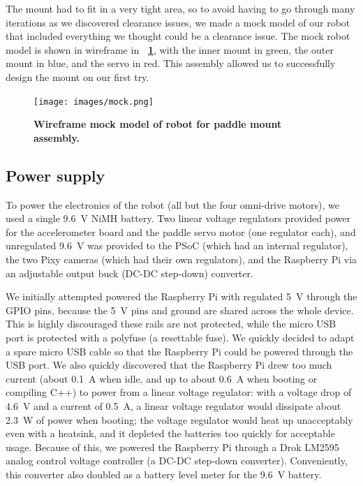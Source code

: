 \documentclass[letterpaper, 11pt]{article}
\newcommand*{\figref}[1]{\textbf{\figurename~\ref{#1}}}
\begin{document}
\begin{enumerate}[label=\textbf{\arabic*.}]
The mount had to fit in a very tight area, so to avoid having to go through many iterations as we discovered clearance issues, we made a mock model of our robot that included everything we thought could be a clearance issue. The mock robot model is shown in wireframe in \figref{fig:mock}, with the inner mount in green, the outer mount in blue, and the servo in red. This assembly allowed us to successfully design the mount on our first try.

\begin{figure}[ht]
    \centering
    \texttt{[image: images/mock.png]}
    \caption{\textbf{Wireframe mock model of robot for paddle mount assembly.}}
    \label{fig:mock}
\end{figure}

\subsection{Power supply}
\label{sec:power}
To power the electronics of the robot (all but the four omni-drive motors), we used a single \SI{9.6}{V} NiMH battery. Two linear voltage regulators provided power for the accelerometer board and the paddle servo motor (one regulator each), and unregulated \SI{9.6}{V} was provided to the PSoC (which had an internal regulator), the two Pixy cameras (which had their own regulators), and the Raspberry Pi via an adjustable output buck (DC-DC step-down) converter.

We initially attempted powered the Raspberry Pi with regulated \SI{5}{V} through the GPIO pins, because the \SI{5}{V} pins and ground are shared across the whole device. This is highly discouraged these rails are not protected, while the micro USB port is protected with a polyfuse (a resettable fuse). We quickly decided to adapt a spare micro USB cable so that the Raspberry Pi could be powered through the USB port. We also quickly discovered that the Raspberry Pi drew too much current (about \SI{0.1}{A} when idle, and up to about \SI{0.6}{A} when booting or compiling C++) to power from a linear voltage regulator: with a voltage drop of \SI{4.6}{V} and a current of \SI{0.5}{A}, a linear voltage regulator would dissipate about \SI{2.3}{W} of power when booting; the voltage regulator would heat up unacceptably even with a heatsink, and it depleted the batteries too quickly for acceptable usage. Because of this, we powered the Raspberry Pi through a Drok LM2595 analog control voltage controller (a DC-DC step-down converter). Conveniently, this converter also doubled as a battery level meter for the \SI{9.6}{V} battery.


\end{enumerate}
\end{document}
